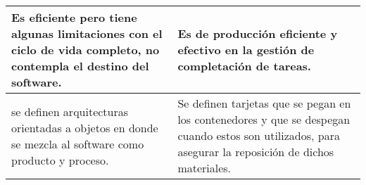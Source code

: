 \documentclass[a4paper,11pt]{report}
\begin{document}
\begin{center}
\begin{tabular}{ | p{7cm} | p{7cm} |}
    Es eficiente pero tiene algunas limitaciones con el ciclo de vida completo, no contempla el destino del software. & Es de producción eficiente y efectivo en la gestión de completación de tareas. \\ \hline
    se definen arquitecturas orientadas a objetos en donde se mezcla al software como producto y proceso. & Se definen tarjetas que se pegan en los contenedores y que se despegan cuando estos son utilizados, para asegurar la reposición de dichos materiales. \\ \hline
    \end{tabular}
\end{center}
\end{document}
